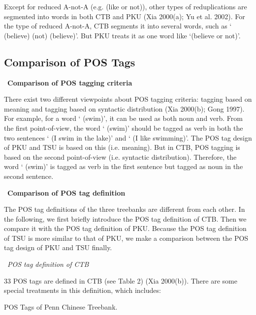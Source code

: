 \documentclass[english]{jnlp_1.4}
\begin{document}
Except for reduced A-not-A (e.g.  (like or not)), other types of 
reduplications are segmented into words in both CTB and PKU (Xia 2000(a); Yu 
et al. 2002). For the type of reduced A-not-A, CTB segments it into several 
words, such as ` (believe)  (not) 
(believe)'. But PKU treats it as one word like 
`(believe or not)'.


\subsection{Comparison of POS Tags}


\noindent
\textbullet\ \textbf{Comparison of POS tagging criteria}

There exist two different viewpoints about POS tagging criteria: tagging 
based on meaning and tagging based on syntactic distribution (Xia 2000(b); 
Gong 1997). For example, for a word ` (swim)', it 
can be used as both noun and verb. From the first point-of-view, the word 
` (swim)' should be tagged as verb in both the two 
sentences ` (I swim in the lake)' and 
` (I like 
swimming)'. The POS tag design of PKU and TSU is based on this (i.e. 
meaning). But in CTB, POS tagging is based on the second point-of-view (i.e. 
syntactic distribution). Therefore, the word 
` (swim)' is tagged as verb in the first sentence 
but tagged as noun in the second sentence. 


\noindent
\textbullet\ \textbf{Comparison of POS tag definition}

The POS tag definitions of the three treebanks are different from each 
other. In the following, we first briefly introduce the POS tag definition 
of CTB. Then we compare it with the POS tag definition of PKU. Because the 
POS tag definition of TSU is more similar to that of PKU, we make a 
comparison between the POS tag design of PKU and TSU finally.


\noindent
\textendash\ \textit{POS tag definition of CTB}

33 POS tags are defined in CTB (see Table 2) (Xia 2000(b)). There are some 
special treatments in this definition, which includes:


\begin{table}[b]
\caption{POS Tags of Penn Chinese Treebank.}

\end{table}
\end{document}
